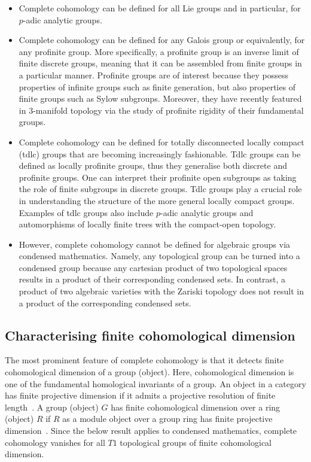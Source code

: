 \documentclass[12pt, a4paper]{article}
\numberwithin{equation}{section}
\theoremstyle{empty}
\theoremstyle{nonumberplain}
\begin{document}
\begin{itemize}
\item Complete cohomology can be defined for all Lie groups and in particular, for $p$-adic analytic groups.
\item Complete cohomology can be defined for any Galois group or equivalently, for any profinite group. More specifically, a profinite group is an inverse limit of finite discrete groups, meaning that it can be assembled from finite groups in a particular manner. Profinite groups are of interest because they possess properties of infinite groups such as finite generation, but also properties of finite groups such as Sylow subgroups. Moreover, they have recently featured in $3$-manifold topology via the study of profinite rigidity of their fundamental groups.
\item Complete cohomology can be defined for totally disconnected locally compact (tdlc) groups that are becoming increasingly fashionable. Tdlc groups can be defined as locally profinite groups, thus they generalise both discrete and profinite groups. One can interpret their profinite open subgroups as taking the role of finite subgroups in discrete groups. Tdlc groups play a crucial role in understanding the structure of the more general locally compact groups. Examples of tdlc groups also include $p$-adic analytic groups and automorphisms of locally finite trees with the compact-open topology.
\item However, complete cohomology cannot be defined for algebraic groups via condensed mathematics. Namely, any topological group can be turned into a condensed group because any cartesian product of two topological spaces results in a product of their corresponding condensed sets. In contrast, a product of two algebraic varieties with the Zariski topology does not result in a product of the corresponding condensed sets.
\end{itemize}

\subsection{Characterising finite cohomological dimension}\label{subsec:findim}

The most prominent feature of complete cohomology is that it detects finite cohomological dimension of a group (object). Here, cohomological dimension is one of the fundamental homological invariants of a group. An object in a category has finite projective dimension if it admits a projective resolution of finite length~\cite[p.~152]{bro82}. A group (object) $G$ has finite cohomological dimension over a ring (object) $R$ if $R$ as a module object over a group ring has finite projective dimension~\cite[p.~184--185]{bro82}. Since the below result applies to condensed mathematics, complete cohomology vanishes for all $T1$ topological groups of finite cohomological dimension.
\end{document}
